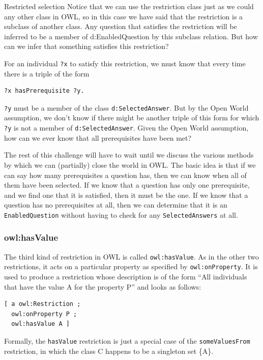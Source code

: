 \begin{challenge}{Restricted selection}
Notice that we can use the restriction class just as we could any other
class in OWL, so in this case we have said that the restriction is a
subclass of another class. Any question that satisfies the restriction
will be inferred to be a member of d:EnabledQuestion by this subclass
relation. But how can we infer that something satisfies this
restriction?

For an individual \texttt{?x} to satisfy this restriction, we must know that
every time there is a triple of the form

\begin{lstlisting}
?x hasPrerequisite ?y.
\end{lstlisting}

\texttt{?y} must be a member of the class \texttt{d:SelectedAnswer}. But by the Open World
assumption, we don't know if there might be another triple of this form
for which \texttt{?y} is not a member of \texttt{d:SelectedAnswer}. Given the Open World
assumption, how can we ever know that all prerequisites have been met?
\end{challenge}

The rest of this challenge will have to wait until we discuss the
various methods by which we can (partially) close the world in OWL. The
basic idea is that if we can say how many prerequisites a question has,
then we can know when all of them have been selected. If we know that a
question has only one prerequisite, and we find one that it is
satisfied, then it must be the one. If we know that a question has no
prerequisites at all, then we can determine that it is an
\texttt{EnabledQuestion} without having to check for any \texttt{SelectedAnswers} at all.

\subsubsection{owl:hasValue}

The third kind of restriction in OWL is called \texttt{owl:hasValue}. As in the
other two restrictions, it acts on a particular property as specified by
\texttt{owl:onProperty}. It is used to produce a restriction whose description is
of the form ``All individuals that have the value A for the property P''
and looks as follows:

\begin{lstlisting}
[ a owl:Restriction ;
  owl:onProperty P ;
  owl:hasValue A ]
\end{lstlisting}

Formally, the \texttt{hasValue} restriction is just a special case of the
\texttt{someValuesFrom} restriction, in which the class C happens to be a
singleton set \{A\}.

